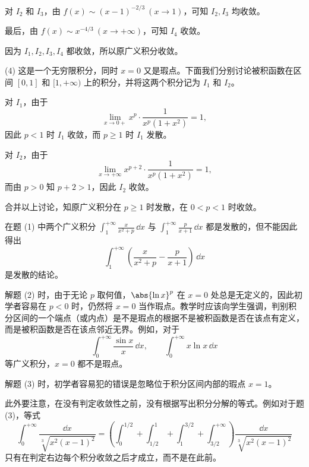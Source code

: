 \begin{xsolution}
对 $I_2$ 和 $I_3$，由 $f(x)\sim(x-1)^{-2/3}\ (x\to1)$，可知 $I_2,I_3$ 均收敛。

最后，由 $f(x)\sim x^{-4/3}\ (x\to+\infty)$，可知 $I_4$ 收敛。

因为 $I_1,I_2,I_3,I_4$ 都收敛，所以原广义积分收敛。

(4) 这是一个无穷限积分，同时 $x=0$ 又是瑕点。下面我们分别讨论被积函数在区间 $[0,1]$ 和 $[1,+\infty)$ 上的积分，并将这两个积分记为 $I_1$ 和 $I_2$。

对 $I_1$，由于
\[
  \lim_{x\to0+}x^p\cdot\frac1{x^p(1+x^2)}=1,
\]
因此 $p<1$ 时 $I_1$ 收敛，而 $p\geq1$ 时 $I_1$ 发散。

对 $I_2$，由于
\[
  \lim_{x\to+\infty}x^{p+2}\cdot\frac1{x^p(1+x^2)}=1,
\]
而由 $p>0$ 知 $p+2>1$，因此 $I_2$ 收敛。

合并以上讨论，知原广义积分在 $p\geq1$ 时发散，在 $0<p<1$ 时收敛。
\end{xsolution}

\begin{xremark}
在题 (1) 中两个广义积分 $\int_1^{+\infty}\frac{x}{x^2+p}\,\dd x$ 与 $\int_1^{+\infty}\frac{p}{x+1}\,\dd x$ 都是发散的，但不能因此得出
\[
  \int_1^{+\infty}\left(\frac{x}{x^2+p}-\frac{p}{x+1}\right)\,\dd x
\]
是发散的结论。

解题 (2) 时，由于无论 $p$ 取何值，$\abs{\ln x}^p$ 在 $x=0$ 处总是无定义的，因此初学者容易在 $p<0$ 时，仍然将 $x=0$ 当作瑕点。教学时应该向学生强调，判别积分区间的一个端点（或内点）是不是瑕点的根据不是被积函数是否在该点有定义，而是被积函数是否在该点邻近无界。例如，对于
\[
  \int_0^{+\infty}\frac{\sin x}{x}\,\dd x,\qquad \int_0^{+\infty}x\ln x\,\dd x
\]
等广义积分，$x=0$ 都不是瑕点。

解题 (3) 时，初学者容易犯的错误是忽略位于积分区间内部的瑕点 $x=1$。

此外要注意，在没有判定收敛性之前，没有根据写出积分分解的等式。例如对于题 (3)，等式
\[
  \int_0^{+\infty}\frac{\dd x}{\sqrt[3]{x^2(x-1)^2}}
  =\left(\int_0^{1/2}+\int_{1/2}^1+\int_1^{3/2}+\int_{3/2}^{+\infty}\right)\frac{\dd x}{\sqrt[3]{x^2(x-1)^2}}
\]
只有在判定右边每个积分收敛之后才成立，而不是在此前。
\end{xremark}

